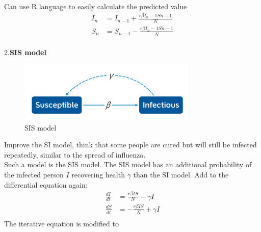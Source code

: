 \documentclass[a4paper, 11pt,twoside=true]{scrartcl}
\begin{document}
Can use R language to easily calculate the predicted value
$$
\begin{aligned}
I_n&=I_{n-1}+\frac{r\beta {I_n}-1S{n-1}}{N}    \\
S_n&=S_{n-1}-\frac{r\beta {	I_n}-1S{n-1}}{N}
\end{aligned}
$$\\
2.\textbf{SIS model}
\begin{figure}[H]
	\small
	\centering
	\includegraphics[width=8.5cm]{E2}
	\caption{SIS model} \label{C2}
\end{figure}
\noindent Improve the SI model, think that some people are cured but will still be infected repeatedly, similar to the spread of influenza.\\
Such a model is the SIS model. The SIS model has an additional probability of the infected person $I$ recovering health $\gamma$ than the SI model. Add to the differential equation again:
$$
\begin{aligned}
\frac{dI}{dt}&=\frac{r\beta IS}{N}-\gamma I\\
\frac{dS}{dt}&=-\frac{r\beta IS}{N}+\gamma I\\
\end{aligned}
$$
The iterative equation is modified to
\end{document}
